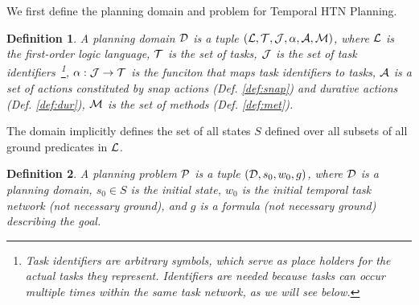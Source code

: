 \documentclass[letterpaper]{article} %
\newtheorem{definition}{Definition}
\begin{document}
 We first define the planning domain and problem for Temporal HTN Planning.
 \begin{definition}
   A \emph{planning domain} $\cal{D}$ is a tuple $({\cal{L}}, {\cal{T}}, {\cal{J}}, \alpha, {\cal{A}}, {\cal{M}})$, where
   $\cal{L}$ is the first-order logic language,
   $\cal{T}$ is the set of tasks,
   $\cal{J}$ is the set of task identifiers~\footnote{Task identifiers are arbitrary symbols, which serve as place holders for the actual tasks they represent. Identifiers are needed because tasks can occur multiple times within the same task network, as we will see below.},
   $\alpha: {\cal{J}} \rightarrow {\cal{T}}$ is the funciton that maps task identifiers to tasks,
   ${\cal{A}}$ is a set of actions constituted by \emph{snap} actions (Def. \ref{def:snap}) and \emph{durative} actions (Def. \ref{def:dur}),
   $\cal{M}$ is the set of methods (Def. \ref{def:met}). %
 \end{definition}

 The domain implicitly defines the set of all states $S$ defined over all subsets of all ground predicates in $\cal{L}$.

 \begin{definition}
 A \emph{planning problem} $\cal{P}$ is a tuple $({\cal{D}}, {s_0}, w_0, g)$, where $\cal{D}$ is a planning domain, $s_0 \in S$ is the initial state, $w_0$ is the initial temporal task network (not necessary ground), and $g$ is a formula (not necessary ground) describing the goal.
 \end{definition}

\end{document}
